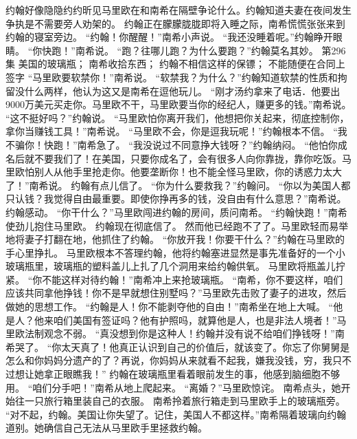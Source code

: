 \documentclass[a4paper,12pt,UTF8,twoside]{ctexbook}
\begin{document}
        约翰好像隐隐约约昕见马里欧在和南希在隔壁争论什么。约翰知道夫妻在夜间发生争执是不需要旁人劝架的。  
        约翰正在朦朦胧胧即将入睡之际，南希慌慌张张来到约翰的寝室旁边。  
        “约翰！你醒醒！”南希小声说。  
        “我还没睡着呢。”约翰睁开眼睛。  
        “你快跑！”南希说。  
        “跑？往哪儿跑？为什么要跑？”约翰莫名其妙。          第296集  
        美国的玻璃瓶；  
        南希收拾东西；  
        约翰不相信这样的保镖；  
        不能随便在合同上签字    
        “马里欧要软禁你！”南希说。  
        “软禁我？为什么？”约翰知道软禁的性质和拘留没什么两样，他认为这又是南希在逗他玩儿。  
        “刚才汤约拿来了电话．他要出9000万美元买走你。马里欧不干，马里欧要当你的经纪人，赚更多的钱。”南希说。  
        “这不挺好吗？”约翰说。  
        “马里欧怕你离开我们，他想把你关起来，彻底控制你，拿你当赚钱工具！”南希说。  
        “马里欧不会，你是逗我玩呢！”约翰根本不信。  
        “我不骗你！快跑！”南希急了。        
        “我没说过不同意挣大钱呀？”约翰纳闷。  
        “他怕你成名后就不要我们了！在美国，只要你成名了，会有很多人向你靠拢，靠你吃饭。马里欧怕别人从他手里抢走你。他要垄断你！也不能全怪马里欧，你的诱惑力太大了！”南希说。  
        约翰有点儿信了。  
        “你为什么要救我？”约翰问。  
        “你以为美国人都只认钱？我觉得自由最重要。即使你挣再多的钱，没自由有什么意思？”南希说。  
        约翰感动。  
        “你干什么？”马里欧闯进约翰的房间，质问南希。  
        “约翰快跑！”南希使劲儿抱住马里欧。  
        约翰现在彻底信了。  
        然而他已经跑不了了。马里欧轻而易举地将妻子打翻在地，他抓住了约翰。  
        “你放开我！你要干什么？”约翰在马里欧的手心里挣扎。  
        马里欧根本不答理约翰，他将约翰塞进显然是事先准备好的一个小玻璃瓶里，玻璃瓶的塑料盖儿上扎了几个洞用来给约翰供氧。  
        马里欧将瓶盖儿拧紧。  
        “你不能这样对待约翰！”南希冲上来抢玻璃瓶。  
        “南希，你不要这样，咱们应该共同拿他挣钱！你不是早就想住别墅吗？”马里欧先击败了妻子的进攻，然后做她的思想工作。  
        “约翰是人！你不能剥夺他的自由！”南希坐在地上大喊。  
        “他是人？他来咱们美国有签证吗？他有护照吗，就算他是人，也是非法人境者！”马里欧法制观念不弱。  
        “真没想到你是这种人！约翰并没有说不给咱们挣钱呀！”南希哭了。  
        “你太天真了！他真正认识到自己的价值后，就该变了。你忘了你舅舅是怎么和你妈妈分遗产的了？再说，你妈妈从来就看不起我，嫌我没钱，穷，我只不过想让她拿正眼瞧我！”  
        约翰在玻璃瓶里看着眼前发生的事，他感到脑细胞不够用。  
        “咱们分手吧！”南希从地上爬起来。  
        “离婚？”马里欧惊诧。  
        南希点头，她开始往一只旅行箱里装自己的衣服。  
        南希拎着旅行箱走到马里欧手上的玻璃瓶旁。  
        “对不起，约翰。美国让你失望了。记住，美国人不都这样。”南希隔着玻璃向约翰道别。她确信自己无法从马里欧手里拯救约翰。  
\end{document}
